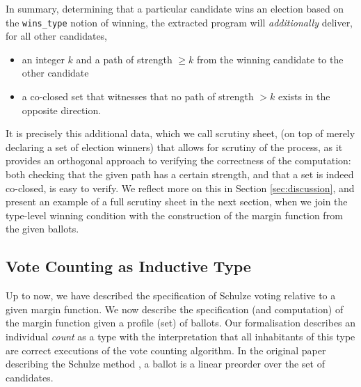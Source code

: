 In summary, determining that a particular candidate wins an election
based on the \texttt{wins\_type} notion of winning, the extracted
program will \emph{additionally} deliver, for all other candidates,
\begin{itemize}
\item an integer $k$ and a path of strength $\geq k$ from the winning candidate to the
other candidate 
\item a co-closed set that witnesses that no path of strength $>k$
exists in the opposite direction.
\end{itemize}

\noindent
It is precisely this additional data, which we call scrutiny sheet,
(on top of merely declaring a set of
election winners) that allows for scrutiny of the process, as it
provides an orthogonal approach to verifying the correctness of the
computation: both checking that the given path has a certain
strength, and that a set is indeed co-closed, is easy to verify.
We reflect more on this in Section
\ref{sec:discussion}, and present an example of a full scrutiny
sheet in the next section, when we join the type-level winning
condition with the construction of the margin function from the
given ballots. 

\subsection{Vote Counting as Inductive Type}
\label{sec:inductive_type}
Up to now, we have described the specification of Schulze voting
relative to a given margin function. We now describe the
specification (and computation) of the margin function given a
profile (set) of ballots.  Our formalisation describes an individual
\emph{count} as a type with the interpretation that all inhabitants
of this type are correct executions of the vote counting algorithm.
In the original paper describing the
Schulze method \citep{Schulze:2011:NMC}, a ballot is a linear
preorder over the set of candidates.


